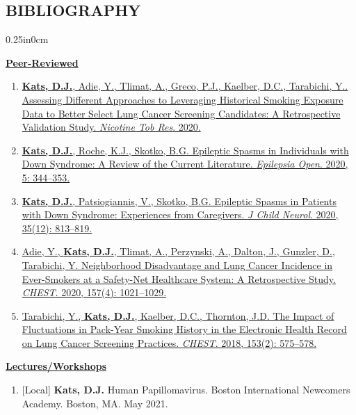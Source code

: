 \documentclass[11pt]{article}
\newcommand{\mysec}[1]{\subsection*{\uppercase{#1}}}
\newcommand{\bibsec}[1]{\underline{\normalsize\bfseries#1}}
\newcommand{\blockindent}{0.25in}
\begin{document}
\mysec{Bibliography}
\begin{adjustwidth}{\blockindent}{0cm}

\bibsec{Peer-Reviewed}
	\begin{enumerate}

		\item\label{katstarabichi20} \href{https://doi.org/10.1093/ntr/ntaa192}{\textbf{Kats, D.J.}, Adie, Y., Tlimat, A., Greco, P.J., Kaelber, D.C., Tarabichi, Y.. Assessing Different Approaches to Leveraging Historical Smoking Exposure Data to Better Select Lung Cancer Screening Candidates: A Retrospective Validation Study. \textit{Nicotine Tob Res}. 2020.}

		\item\label{katsroche20} \href{http://dx.doi.org/10.1002/epi4.12412}{\textbf{Kats, D.J.}, Roche, K.J., Skotko, B.G. Epileptic Spasms in Individuals with Down Syndrome: A Review of the Current Literature. \textit{Epilepsia Open}. 2020, 5: 344--353.}

		\item\label{kats20} \href{https://doi.org/10.1177/0883073820932770}{\textbf{Kats, D.J.}, Patsiogiannis, V., Skotko, B.G. Epileptic Spasms in Patients with Down Syndrome: Experiences from Caregivers. \textit{J Child Neurol}. 2020, 35(12): 813--819.}

		\item\label{adie20} \href{https://journal.chestnet.org/article/S0012-3692(19)34402-2/fulltext}{Adie, Y., \textbf{Kats, D.J.}, Tlimat, A., Perzynski, A., Dalton, J., Gunzler, D., Tarabichi, Y. Neighborhood Disadvantage and Lung Cancer Incidence in Ever-Smokers at a Safety-Net Healthcare System: A Retrospective Study. \textit{CHEST}. 2020, 157(4): 1021--1029.}

		\item\label{tarabichi17} \href{http://journal.chestnet.org/article/S0012-3692(17)33076-3/fulltext}{Tarabichi, Y., \textbf{Kats, D.J.}, Kaelber, D.C., Thornton, J.D. The Impact of Fluctuations in Pack-Year Smoking History in the Electronic Health Record on Lung Cancer Screening Practices. \textit{CHEST}. 2018, 153(2): 575--578.}

	\end{enumerate}

\bibsec{Lectures/Workshops}
	\begin{enumerate}[resume]

		\item\label{binca-hpv}[Local] \textbf{Kats, D.J.} Human Papillomavirus. Boston International Newcomers Academy. Boston, MA. May 2021.


\end{enumerate}
\end{adjustwidth}
\end{document}
